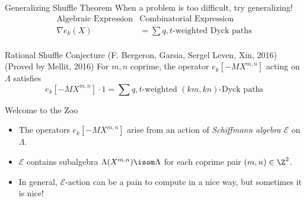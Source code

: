 \documentclass{beamer}
\newcommand{\sym}{\Lambda}
\newcommand{\Ecal}{{\mathcal E}}
\newcounter{c}
\begin{document}
\begin{frame}{Generalizing Shuffle Theorem}
  When a problem is too difficult, try generalizing! \pause
  \begin{eqnarray*}
    \text{Algebraic Expression} & \text{Combinatorial Expression}\\
    \nabla e_k(X) & = \sum q,t\text{-weighted Dyck paths}\\
  \end{eqnarray*}\pause
  \vspace{-5ex}
   \begin{block}{Rational Shuffle Conjecture (F. Bergeron, Garsia,
      Sergel Leven, Xin, 2016) (Proved by Mellit, 2016)}
    For \(m,n\) coprime, the operator \(e_k[-MX^{m,n}]\) acting on
    \(\sym\) satisfies \[
      e_k[-M X^{m,n}] \cdot 1 = \sum q,t\text{-weighted
      }(km,kn)\text{-Dyck paths}
    \]
    \end{block}\pause
\end{frame}
\begin{frame}{Welcome to the Zoo}
  \begin{itemize}
  \item The operators \(e_k[-MX^{m,n}]\) arise from an action of
    \emph{Schiffmann algebra} \(\Ecal\) on \(\Lambda\). \pause
  \item \(\Ecal\) contains subalgebra
    \(\Lambda(X^{m,n}) \isom \Lambda\) for each coprime pair
    \((m,n) \in \Z^2\).\pause
  \item In general, \(\Ecal\)-action can be a pain to compute in a
    nice way, but
    sometimes it is nice!
  \end{itemize}
  \begin{equation*}
\end{equation*}
\end{frame}
\end{document}
